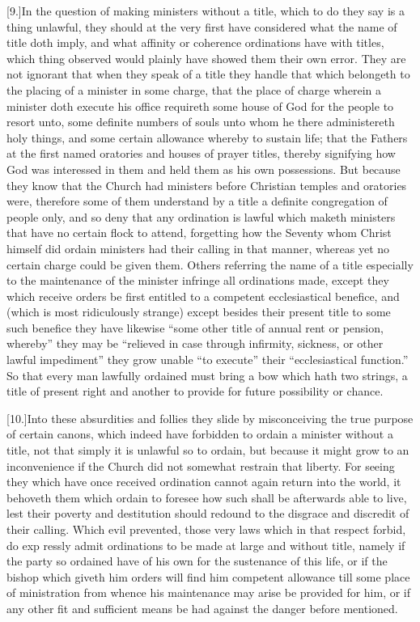 [9.]In the question of making ministers without a title, which to do they say is a thing unlawful, they should at the very first have considered what the name of title doth imply, and what affinity or coherence ordinations have with titles, which thing observed would plainly have showed them their own error. They are not ignorant that when they speak of a title they handle that which belongeth to the placing of a minister in some charge, that the place of charge wherein a minister doth execute his office requireth some house of God for the people to resort unto, some definite numbers of souls unto whom he there administereth holy things, and some certain allowance whereby to sustain life; that the Fathers at the first named oratories and houses of prayer titles, thereby  signifying how God was interessed in them and held them as his own possessions.
 But because they know that the Church had ministers before Christian temples and oratories were, therefore some of them understand by a title a definite congregation of people only, and so deny that any ordination is lawful which maketh ministers that have no certain flock to attend, forgetting how the Seventy whom Christ himself did ordain ministers had their calling in that manner, whereas yet no certain charge could be given them. Others referring the name of a title especially to the maintenance of the minister infringe all ordinations made, except they which receive orders be first entitled to a competent ecclesiastical benefice, and (which is most ridiculously strange) except besides their present title to some such benefice they have likewise “some other title of annual rent or pension, whereby” they may be “relieved in case through infirmity, sickness, or other lawful impediment” they grow unable “to execute” their “ecclesiastical function.” So that every man lawfully ordained must bring a bow which hath two strings, a title of present right and another to provide for future possibility or chance.

[10.]Into these absurdities and follies they slide by misconceiving the true purpose of certain canons, which indeed  have forbidden to ordain a minister without a title,
 not that simply it is unlawful so to ordain, but because it might grow to an inconvenience if the Church did not somewhat restrain that liberty. For seeing they which have once received ordination cannot again return into the world, it behoveth them which ordain to foresee how such shall be afterwards able to live, lest their poverty and destitution should redound to the disgrace and discredit of their calling. Which evil prevented, those very laws which in that respect forbid, do exp ressly admit ordinations to be made at large and without title, namely if the party so ordained have of his own for the sustenance of this life, or if the bishop which giveth him orders will find him competent allowance till some place of ministration from whence his maintenance may arise be provided for him, or if any other fit and sufficient means be had against the danger before mentioned.

